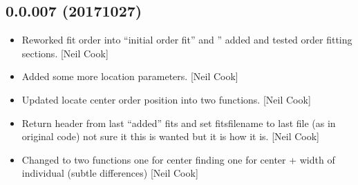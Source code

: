 \documentclass[a4paper,10pt,english]{report}
\begin{document}
\subsection{0.0.007 (2017\sphinxhyphen{}10\sphinxhyphen{}27)}
\label{\detokenize{misc/changelog:id562}}\begin{itemize}
\item {} 
Reworked fit order into “initial order fit” and ”
added and tested order fitting sections. {[}Neil Cook{]}

\item {} 
Added some more location parameters. {[}Neil Cook{]}

\item {} 
Updated locate center order position into two functions. {[}Neil Cook{]}

\item {} 
Return header from last “added” fits and set fitsfilename to last file
(as in original code) \sphinxhyphen{} not sure it this is wanted but it is how it
is. {[}Neil Cook{]}

\item {} 
Changed  to two functions one for center
finding one for center + width of individual (subtle differences)
{[}Neil Cook{]}

\end{itemize}
\end{document}

